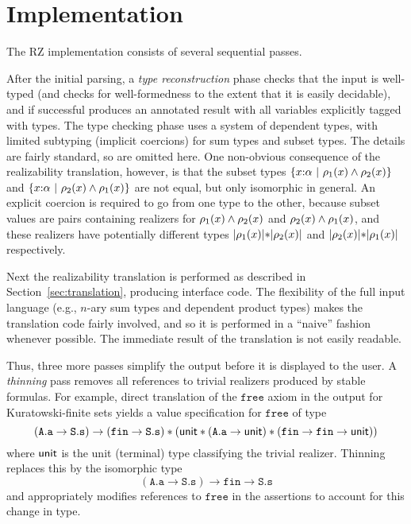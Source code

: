 \section{Implementation}
\label{sec:implementation}

The RZ implementation consists of several sequential passes.

After the initial parsing, a \emph{type reconstruction} phase checks
that the input is well-typed (and checks for well-formedness to the
extent that it is easily decidable), and if successful produces an
annotated result with all variables explicitly tagged with types. The
type checking phase uses a system of dependent types, with limited
subtyping (implicit coercions) for sum types and subset types. The
details are fairly standard, so are omitted here. One non-obvious
consequence of the realizability translation, however, is that the
subset types $\{x{:}\alpha\ |\ \rho_1(x)\land \rho_2(x)\}$ and
$\{x{:}\alpha\ |\ \rho_2(x)\land \rho_1(x)\}$ are not
equal, but only isomorphic in general. An
explicit coercion is required to go from one type to the other,
because subset values are pairs containing realizers for
$\rho_1(x)\land \rho_2(x)$ and
$\rho_2(x)\land \rho_1(x)$, and these realizers have
potentially different types $|\rho_1(x)|\mathtt{*}|\rho_2(x)|$ and
$|\rho_2(x)|\mathtt{*}|\rho_1(x)|$ respectively.

Next the realizability translation is performed as described in
Section~\ref{sec:translation}, producing interface code. The
flexibility of the full input language (e.g., $n$-ary sum types and
dependent product types) makes the translation code fairly involved,
and so it is performed in a ``naive'' fashion whenever possible. The
immediate result of the translation is not easily readable.
 
Thus, three more passes simplify the output before it is displayed to
the user. A \emph{thinning} pass removes all references to trivial
realizers produced by stable formulas. For example, direct translation
of the $\mathtt{free}$ axiom in the output for Kuratowski-finite sets
yields a value specification for $\mathtt{free}$ of type
%
\begin{equation*}
  (\mathtt{A.a} \to \mathtt{S.s}) \to 
  (\mathtt{fin} \to \mathtt{S.s}) * (\mathsf{unit} * (\mathtt{A.a} \to
  \mathsf{unit}) *
  (\mathtt{fin} \to \mathtt{fin} \to \mathsf{unit}))
\end{equation*}
%
where $\mathsf{unit}$ is the unit (terminal) type classifying the trivial
realizer. Thinning replaces this by the isomorphic type
%
\begin{equation*}
  (\mathtt{A.a} \to \mathtt{S.s}) \to \mathtt{fin} \to \mathtt{S.s}
\end{equation*}
%
and appropriately modifies references to $\mathtt{free}$ in the assertions to account for this change in type.

